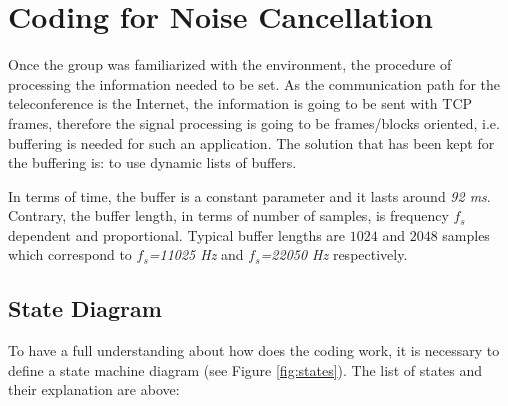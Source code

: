 \documentclass[11pt,a4paper,english]{book}  %
\theoremstyle{definition}  %
\theoremstyle{plain}  %
\theoremstyle{remark}  %
\begin{document}
\section{Coding for Noise Cancellation}
\label{sec:coding}

Once the group was familiarized with the environment, the procedure of processing the information needed to be set. As the communication path for the teleconference is the Internet, the information is going to be sent with TCP frames, therefore the signal processing is going to be frames/blocks oriented, i.e. buffering is needed for such an application. The solution that has been kept for the buffering is: to use dynamic lists of buffers.

In terms of time, the buffer is a constant parameter and it lasts around \textit{92 ms}. Contrary, the buffer length, in terms of number of samples, is frequency $f_{s}$ dependent and proportional. Typical buffer lengths are $1024$ and $2048$ samples which correspond to \textit{$f_{s}$=11025 Hz} and \textit{$f_{s}$=22050 Hz} respectively.


	\subsection{State Diagram}
	
	To have a full understanding about how does the coding work, it is necessary to define a state machine diagram (see Figure \ref{fig:states}). The list of states and their explanation are above:
	
\end{document}

